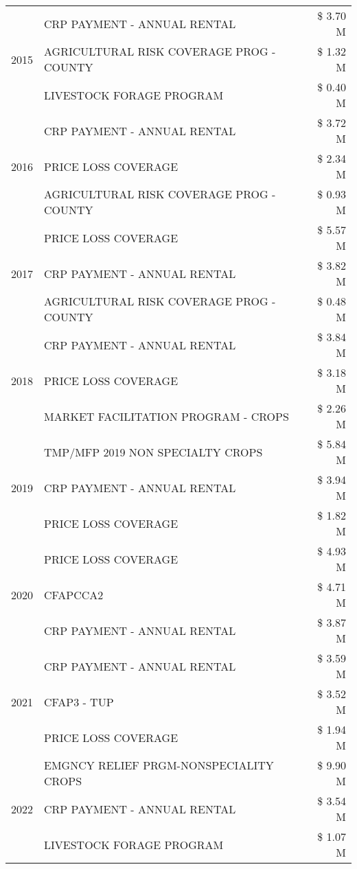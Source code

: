 \begin{tabular}{llr}
\cline{1-3}
\multirow[t]{3}{*}{2015} & CRP PAYMENT - ANNUAL RENTAL & \$ 3.70 M \\
 & AGRICULTURAL RISK COVERAGE PROG - COUNTY & \$ 1.32 M \\
 & LIVESTOCK FORAGE PROGRAM & \$ 0.40 M \\
\cline{1-3}
\multirow[t]{3}{*}{2016} & CRP PAYMENT - ANNUAL RENTAL & \$ 3.72 M \\
 & PRICE LOSS COVERAGE & \$ 2.34 M \\
 & AGRICULTURAL RISK COVERAGE PROG - COUNTY & \$ 0.93 M \\
\cline{1-3}
\multirow[t]{3}{*}{2017} & PRICE LOSS COVERAGE & \$ 5.57 M \\
 & CRP PAYMENT - ANNUAL RENTAL & \$ 3.82 M \\
 & AGRICULTURAL RISK COVERAGE PROG - COUNTY & \$ 0.48 M \\
\cline{1-3}
\multirow[t]{3}{*}{2018} & CRP PAYMENT - ANNUAL RENTAL & \$ 3.84 M \\
 & PRICE LOSS COVERAGE & \$ 3.18 M \\
 & MARKET FACILITATION PROGRAM - CROPS & \$ 2.26 M \\
\cline{1-3}
\multirow[t]{3}{*}{2019} & TMP/MFP 2019 NON SPECIALTY CROPS & \$ 5.84 M \\
 & CRP PAYMENT - ANNUAL RENTAL & \$ 3.94 M \\
 & PRICE LOSS COVERAGE & \$ 1.82 M \\
\cline{1-3}
\multirow[t]{3}{*}{2020} & PRICE LOSS COVERAGE & \$ 4.93 M \\
 & CFAPCCA2 & \$ 4.71 M \\
 & CRP PAYMENT - ANNUAL RENTAL & \$ 3.87 M \\
\cline{1-3}
\multirow[t]{3}{*}{2021} & CRP PAYMENT - ANNUAL RENTAL & \$ 3.59 M \\
 & CFAP3 - TUP & \$ 3.52 M \\
 & PRICE LOSS COVERAGE & \$ 1.94 M \\
\cline{1-3}
\multirow[t]{3}{*}{2022} & EMGNCY RELIEF PRGM-NONSPECIALITY CROPS & \$ 9.90 M \\
 & CRP PAYMENT - ANNUAL RENTAL & \$ 3.54 M \\
 & LIVESTOCK FORAGE PROGRAM & \$ 1.07 M \\
\cline{1-3}
\bottomrule
\end{tabular}
